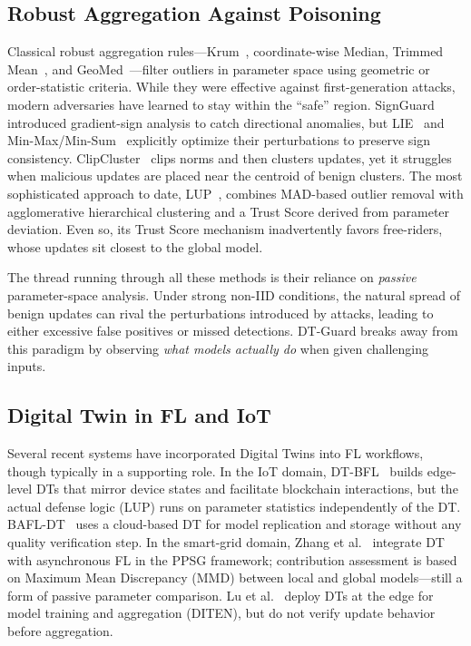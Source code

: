 \documentclass[conference]{IEEEtran}
\begin{document}
    \subsection{Robust Aggregation Against Poisoning}
    
    Classical robust aggregation rules---Krum~\cite{blanchard2017machine}, coordinate-wise Median, Trimmed Mean~\cite{yin2018byzantine}, and GeoMed~\cite{pillutla2022robust}---filter outliers in parameter space using geometric or order-statistic criteria. While they were effective against first-generation attacks, modern adversaries have learned to stay within the ``safe'' region. SignGuard~\cite{xu2022signguard} introduced gradient-sign analysis to catch directional anomalies, but LIE~\cite{baruch2019little} and Min-Max/Min-Sum~\cite{shejwalkar2021manipulating} explicitly optimize their perturbations to preserve sign consistency. ClipCluster~\cite{zeng2024clipcluster} clips norms and then clusters updates, yet it struggles when malicious updates are placed near the centroid of benign clusters. The most sophisticated approach to date, LUP~\cite{issa2025dtbfl}, combines MAD-based outlier removal with agglomerative hierarchical clustering and a Trust Score derived from parameter deviation. Even so, its Trust Score mechanism inadvertently favors free-riders, whose updates sit closest to the global model.
    
    The thread running through all these methods is their reliance on \emph{passive} parameter-space analysis. Under strong non-IID conditions, the natural spread of benign updates can rival the perturbations introduced by attacks, leading to either excessive false positives or missed detections. DT-Guard breaks away from this paradigm by observing \emph{what models actually do} when given challenging inputs.
    
    \subsection{Digital Twin in FL and IoT}
    
    Several recent systems have incorporated Digital Twins into FL workflows, though typically in a supporting role. In the IoT domain, DT-BFL~\cite{issa2025dtbfl} builds edge-level DTs that mirror device states and facilitate blockchain interactions, but the actual defense logic (LUP) runs on parameter statistics independently of the DT. BAFL-DT~\cite{qu2021bafldt} uses a cloud-based DT for model replication and storage without any quality verification step. In the smart-grid domain, Zhang et al.~\cite{zhang2025ppsg} integrate DT with asynchronous FL in the PPSG framework; contribution assessment is based on Maximum Mean Discrepancy (MMD) between local and global models---still a form of passive parameter comparison. Lu et al.~\cite{lu2020diten} deploy DTs at the edge for model training and aggregation (DITEN), but do not verify update behavior before aggregation.
    
\end{document}
